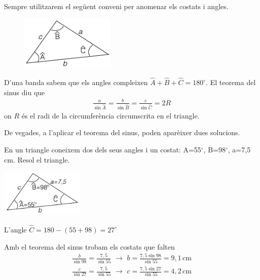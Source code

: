 \begin{theorybox}
	
	Sempre utilitzarem el següent conveni per anomenar els costats i angles.
	
	\begin{figure}
		\centering
		\vspace{-1.5cm}
		\includegraphics[width=4.5cm]{img-03/triangle-qualsevol1}
	\end{figure}
	
	D'una banda sabem que els angles compleixen $\hat A+\hat B+\hat C=180^\circ$. El teorema del sinus diu que 
	\begin{eqnarray*}
		\frac{a}{\sin \hat A}=\frac{b}{\sin \hat B}=\frac{c}{\sin \hat C}=2R
	\end{eqnarray*}
	on $R$ és el radi de la circumferència circumscrita en el triangle.
	
	De vegades, a l'aplicar el teorema del sinus, poden aparèixer dues solucions. 
	\vspace{0.7cm}
	
\end{theorybox}

\begin{resolt}[E]{En un triangle coneixem dos dels seus angles i un costat: A=55${}^\circ$, B=98${}^\circ$, a=7,5 cm. Resol el triangle.
		\begin{center}
			\includegraphics[width=4cm]{img-03/triangle-qualsevol2}
		\end{center}
}
	
	
	
	L'angle $\hat C=180 -(55+98)=27^\circ$
	
	Amb el teorema del sinus trobam els costats que falten
	\begin{eqnarray*}
		\frac{b}{\sin 98}= \frac{7,5}{\sin 55} \,\, \rightarrow \,\,  b=\frac{7,5 \sin 98}{\sin 55}=9,1 \,\mathrm{cm}\\
		\frac{c}{\sin 27}= \frac{7,5}{\sin 55} \,\, \rightarrow \,\,  c=\frac{7,5 \sin 27}{\sin 55}=4,2 \,\mathrm{cm}
	\end{eqnarray*}
	
	
\end{resolt}
\vspace{0.5cm}


